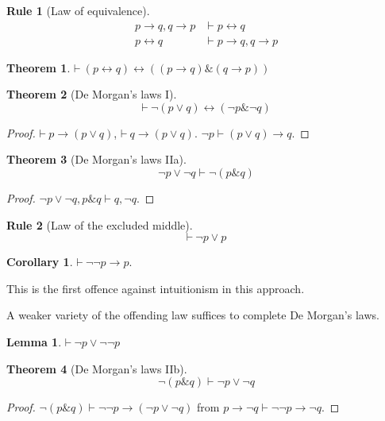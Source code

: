 \documentclass{amsbook}
\newcommand{\infers}{\mathrel\vdash}
\newcommand{\theorem}{\mathord\vdash\medspace}
\newcommand{\then}{\mathrel\rightarrow}
\newcommand{\conj}{\mathrel\&}
\newcommand{\eqv}{\mathrel\leftrightarrow}
\newcommand{\disj}{\mathrel\vee}
\theoremstyle{definition}
\newtheorem{frule}{Rule}[chapter]
\newtheorem{thm}{Theorem}[section]
\newtheorem{lmm}{Lemma}[section]
\newtheorem{crl}{Corollary}[section]
\begin{document}
\begin{frule}[Law of equivalence]
    \begin{align*}
        p \then q, q \then p & \infers p \eqv q             \\
        p \eqv q             & \infers p \then q, q \then p
    \end{align*}
\end{frule}

\begin{thm}
    $\theorem (p \eqv q) \eqv ((p \then q) \conj (q \then p))$
\end{thm}

\begin{thm}[De Morgan's laws I]
    $$\theorem \neg(p \disj q) \eqv (\neg p \conj \neg q)$$
    \begin{proof}
        $\theorem p \then (p \disj q)$, $\theorem q \then (p \disj q)$. $\neg p \infers (p \disj q) \then q$.
    \end{proof}
\end{thm}

\begin{thm}[De Morgan's laws IIa]
    $$\neg p \disj \neg q \infers \neg(p \conj q)$$
    \begin{proof}
        $\neg p \disj \neg q, p \conj q \infers q, \neg q$.
    \end{proof}
\end{thm}

\begin{frule}[Law of the excluded middle]
    $$\theorem \neg p \disj p$$
\end{frule}

\begin{crl}
    $\theorem \neg\neg p \then p$.
\end{crl}

This is the first offence against intuitionism in this approach.

A weaker variety of the offending law suffices to complete De Morgan's laws.

\begin{lmm}
    $\theorem \neg p \disj \neg\neg p$
\end{lmm}

\begin{thm}[De Morgan's laws IIb]
    $$\neg(p \conj q) \infers \neg p \disj \neg q$$
    \begin{proof}
        $\neg(p \conj q) \infers \neg\neg p \then (\neg p \disj \neg q)$ from $p \then \neg q \infers \neg\neg p \then \neg q$.
    \end{proof}
\end{thm}
\end{document}
